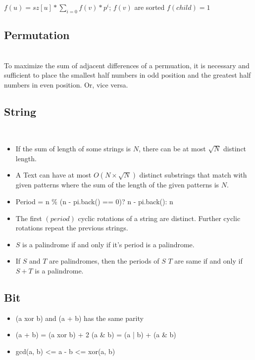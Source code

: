{\( f(u) = sz[u] * \sum_{i = 0} f(v) * p^{i} \);    \( f(v) \) are sorted \)
\( f(child) = 1 \)

\subsection{Permutation} \\
To maximize the sum of adjacent differences of a permuation, it is necessary and sufficient to place the smallest half numbers in odd position and the greatest half numbers in even position. Or, vice versa.

\subsection{String} \\

\begin{itemize}[leftmargin=*, noitemsep]
  \item If the sum of length of some strings is \( N \), there can be at most \( \sqrt{N} \) distinct length.
  \item A Text can have at most \( O(N \times \sqrt{N}) \) distinct substrings that match with given patterns where the sum of the length of the given patterns is \( N \).
  \item Period =  n \% (n - pi.back() == 0)? n - pi.back(): n
  \item The first \( (period) \) cyclic rotations of a string are distinct. Further cyclic rotations repeat the previous strings.
  \item \( S \) is a palindrome if and only if it's period is a palindrome.
  \item If $S$ and $T$ are palindromes, then the periods of $S$  $T$ are same if and only if $S + T$ is a palindrome.
\end{itemize}

\subsection{Bit}
\begin{itemize}[leftmargin=*, noitemsep]
  \item (a xor b) and (a + b) has the same parity
  \item (a + b) = (a xor b) + 2 (a \& b) = (a | b) + (a \& b)\\
  \item gcd(a, b) <= a - b <= xor(a, b)
\end{itemize}

}
